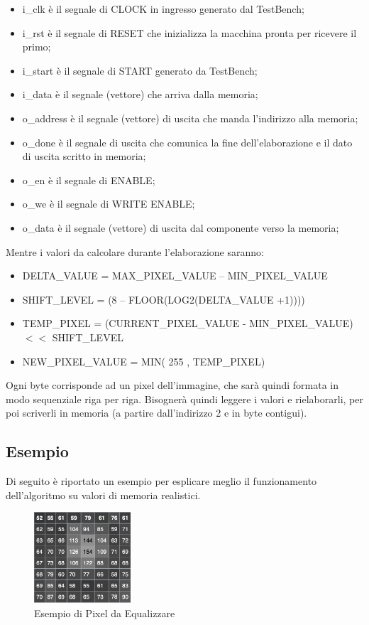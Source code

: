 \documentclass{article}
\begin{document}
\begin{itemize}
\item i_clk è il segnale di CLOCK in ingresso generato dal TestBench;
\item i_rst è il segnale di RESET che inizializza la macchina pronta per ricevere il primo;
\item i_start è il segnale di START generato da TestBench;
\item i_data è il segnale (vettore) che arriva dalla memoria;
\item o_address è il segnale (vettore) di uscita che manda l’indirizzo alla memoria;
\item o_done è il segnale di uscita che comunica la fine dell’elaborazione e il dato di uscita scritto in memoria;
\item o_en è il segnale di ENABLE;
\item o_we è il segnale di WRITE ENABLE;
\item o_data è il segnale (vettore) di uscita dal componente verso la memoria;
\end{itemize}
Mentre i valori da calcolare durante l'elaborazione saranno:
\newline
\begin{itemize}
\item DELTA_VALUE = MAX_PIXEL_VALUE – MIN_PIXEL_VALUE
\item SHIFT_LEVEL = (8 – FLOOR(LOG2(DELTA_VALUE +1))))
\item TEMP_PIXEL = (CURRENT_PIXEL_VALUE - MIN_PIXEL_VALUE) \(<<\) SHIFT_LEVEL
\item NEW_PIXEL_VALUE = MIN( 255 , TEMP_PIXEL)
\end{itemize}

Ogni byte corrisponde ad un pixel dell’immagine, che sarà quindi formata in modo sequenziale riga per riga. Bisognerà quindi leggere i valori e rielaborarli, per poi scriverli in memoria (a partire dall’indirizzo 2 e in byte contigui).
\subsection{Esempio} 
Di seguito è riportato un esempio per esplicare meglio il funzionamento dell'algoritmo su valori di memoria realistici.
\begin{figure}[hbt!]
\centering
\includegraphics[width=0.32\textwidth]{BeforeEq.png}
\caption{Esempio di Pixel da Equalizzare}
\end{figure}
\end{document}
